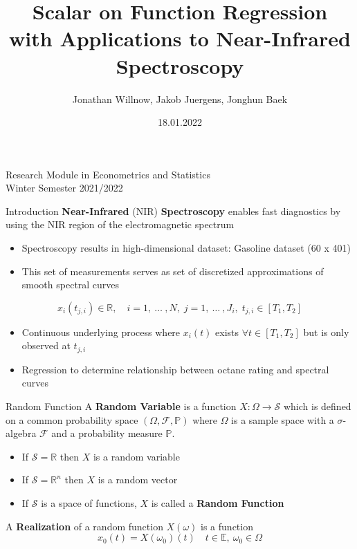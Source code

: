 \documentclass{beamer}
\title{Scalar on Function Regression \\
with Applications to Near-Infrared Spectroscopy}
\author{Jonathan Willnow, Jakob Juergens, Jonghun Baek}
\date{18.01.2022}
\begin{document}
	
	\begin{frame}
		\titlepage 
		\begin{center}
			{\small
			Research Module in Econometrics and Statistics \\
			Winter Semester 2021/2022}
		\end{center}
	\end{frame}
	
	\logo{}
	
	\begin{frame}{Introduction}
		\textbf{Near-Infrared} (NIR) \textbf{Spectroscopy} enables fast diagnostics by using the NIR region of the electromagnetic spectrum
		\begin{itemize}
			\item Spectroscopy results in high-dimensional dataset: Gasoline dataset (60 x 401)
			\item This set of measurements serves as set of discretized approximations of smooth spectral curves
		\end{itemize}
		\vspace{0.2cm}
		$$x_{i}(t_{j,i}) \in \mathbb{R}, \quad i = 1,\: \dots\: ,N, \; j = 1, \: \dots \:, J_i, \; t_{j,i} \in [T_1, T_2]$$
	
		\begin{itemize}
			\item Continuous underlying process where $x_i(t)$ exists $\forall t \in [T_1, T_2]$ but is only observed at $t_{j,i}$
			\item Regression to determine relationship between octane rating and spectral curves
		\end{itemize}
		
	\end{frame}

	 \begin{frame}{Random Function}
		A \textbf{Random Variable} is a function $X : \Omega \rightarrow
		\mathcal{S}$ which is defined on a common probability space $(\Omega,
		\mathcal{F}, \mathbb{P})$ where $\Omega$ is a sample space with a
		$\sigma$-algebra $\mathcal{F}$ and a probability measure $\mathbb{{P}}.$
		\vspace{0.2cm}
		
		\begin{itemize}
			\item If $\mathcal{S} = \mathbb{R}$ then $X$ is a random variable
			\item If $\mathcal{S} = \mathbb{R}^{n}$ then $X$ is a random
			vector
			\item If $\mathcal{S}$ is a space of functions, $X$ is called a
			\textbf{Random Function}
		\end{itemize}
		\vspace{0.2cm}
		
		A \textbf{Realization} of a random function $X(\omega)$ is a function 
		$$x_0(t) = X(\omega_0)(t) \quad t \in \mathbb{E}, \: \omega_0 \in \Omega$$
	\end{frame}
	
\end{document}
